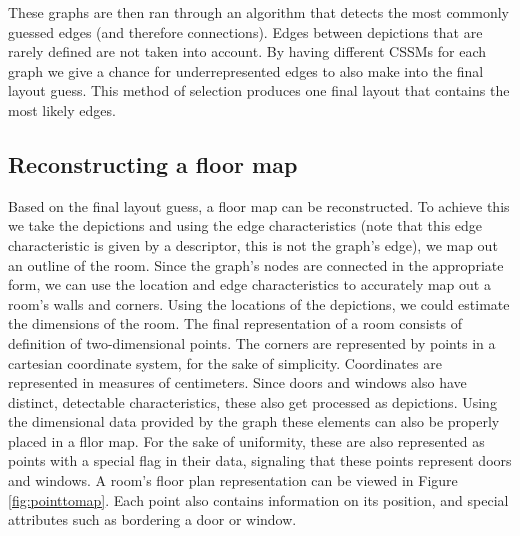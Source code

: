 These graphs are then ran through an algorithm that detects the most commonly guessed edges (and therefore connections). Edges between depictions that are rarely defined are not taken into account. By having different CSSMs for each graph we give a chance for underrepresented edges to also make into the final layout guess. This method of selection produces one final layout that contains the most likely edges.


\subsection{Reconstructing a floor map}

Based on the final layout guess, a floor map can be reconstructed. To achieve this we take the depictions and using the edge characteristics (note that this edge characteristic is given by a descriptor, this is not the graph's edge), we map out an outline of the room. Since the graph's nodes are connected in the appropriate form, we can use the location and edge characteristics to accurately map out a room's walls and corners. Using the locations of the depictions, we could estimate the dimensions of the room. The final representation of a room consists of definition of two-dimensional points. The corners are represented by points in a cartesian coordinate system, for the sake of simplicity. Coordinates are represented in measures of centimeters. Since doors and windows also have distinct, detectable characteristics, these also get processed as depictions. Using the dimensional data provided by the graph these elements can also be properly placed in a fllor map. For the sake of uniformity, these are also represented as points with a special flag in their data, signaling that these points represent doors and windows. A room's floor plan representation can be viewed in Figure \ref{fig:pointtomap}. Each point also contains information on its position, and special attributes such as bordering a door or window.

